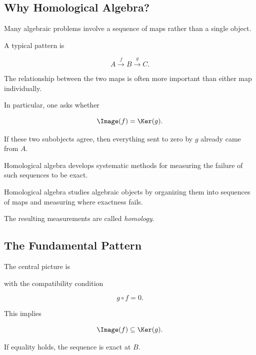 \subsection{Why Homological Algebra?}
\label{subsec:why-homological-algebra}

Many algebraic problems involve a sequence of maps rather than a single
object.

A typical pattern is

\[ A\xrightarrow{f}B\xrightarrow{g}C. \]

The relationship between the two maps is often more important than either
map individually.

In particular, one asks whether

\[ \Image(f)=\Ker(g). \]

If these two subobjects agree, then everything sent to zero by \(g\) already
came from \(A\).

Homological algebra develops systematic methods for measuring the failure of
such sequences to be exact.

\begin{conceptbox}
Homological algebra studies algebraic objects by organizing them into
sequences of maps and measuring where exactness fails.

The resulting measurements are called \emph{homology}.
\end{conceptbox}

\subsection{The Fundamental Pattern}
\label{subsec:fundamental-homological-pattern}

The central picture is

\begin{center}
\end{center}

with the compatibility condition

\[ g\circ f=0. \]

This implies

\[ \Image(f)\subseteq\Ker(g). \]

If equality holds, the sequence is exact at \(B\).

